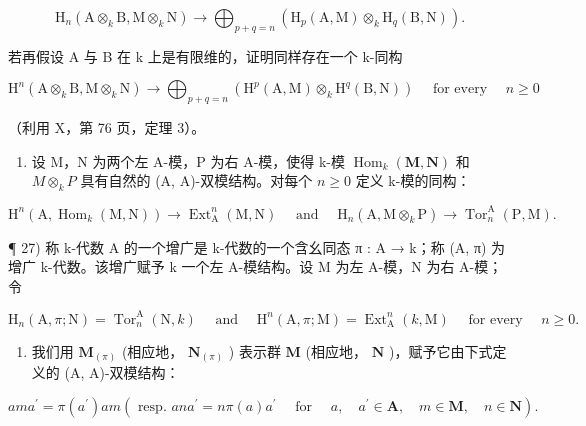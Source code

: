 \[
\mathrm{H} _ {n} (\mathrm{A} \otimes_ {k} \mathrm{B}, \mathrm{M} \otimes_ {k} \mathrm{N}) \rightarrow \bigoplus_ {p + q = n} \left(\mathrm{H} _ {p} (\mathrm{A}, \mathrm{M}) \otimes_ {k} \mathrm{H} _ {q} (\mathrm{B}, \mathrm{N})\right).
\]

若再假设 A 与 B 在 k 上是有限维的，证明同样存在一个 k-同构

\[
\mathrm{H} ^ {n} (\mathrm{A} \otimes_ {k} \mathrm{B}, \mathrm{M} \otimes_ {k} \mathrm{N}) \rightarrow \bigoplus_ {p + q = n} \left(\mathrm{H} ^ {p} (\mathrm{A}, \mathrm{M}) \otimes_ {k} \mathrm{H} ^ {q} (\mathrm{B}, \mathrm{N})\right) \quad \text { for   every } \quad n \geqslant 0
\]

（利用 X，第 76 页，定理 3）。

\begin{enumerate}
\def\labelenumi{\alph{enumi})}
\setcounter{enumi}{4}
\tightlist
\item
  设 M，N 为两个左 A-模，P 为右 A-模，使得 k-模 \(\operatorname{Hom}_{k}(\mathbf{M}, \mathbf{N})\) 和 \(M \otimes_{k} P\) 具有自然的 (A, A)-双模结构。对每个 \(n \geqslant 0\) 定义 k-模的同构：
\end{enumerate}

\[
\mathrm{H} ^ {n} (\mathrm{A}, \operatorname{Hom} _ {k} (\mathrm{M}, \mathrm{N})) \rightarrow \operatorname{Ext} _ {\mathrm{A}} ^ {n} (\mathrm{M}, \mathrm{N}) \quad \text { and } \quad \mathrm{H} _ {n} (\mathrm{A}, \mathrm{M} \otimes_ {k} \mathrm{P}) \rightarrow \operatorname{Tor} _ {n} ^ {\mathrm{A}} (\mathrm{P}, \mathrm{M}).
\]

¶ 27) 称 k-代数 A 的一个增广是 k-代数的一个含幺同态 π : A → k；称 (A, π) 为增广 k-代数。该增广赋予 k 一个左 A-模结构。设 M 为左 A-模，N 为右 A-模；令

\[
\mathrm{H} _ {n} (\mathrm{A}, \pi ; \mathrm{N}) = \operatorname{Tor} _ {n} ^ {\mathrm{A}} (\mathrm{N}, k) \quad \text { and } \quad \mathrm{H} ^ {n} (\mathrm{A}, \pi ; \mathrm{M}) = \operatorname{Ext} _ {\mathrm{A}} ^ {n} (k, \mathrm{M}) \quad \text { for   every } \quad n \geqslant 0.
\]

\begin{enumerate}
\def\labelenumi{\alph{enumi})}
\tightlist
\item
  我们用 \(\mathbf{M}_{(\pi)}\) (相应地， \(\mathbf{N}_{(\pi)}\) ) 表示群 \(\mathbf{M}\) (相应地， \(\mathbf{N}\) )，赋予它由下式定义的 (A, A)-双模结构：
\end{enumerate}

\[
a m a ^ {\prime} = \pi (a ^ {\prime}) a m (\text { resp. } a n a ^ {\prime} = n \pi (a) a ^ {\prime} \quad \text { for } \quad a, \quad a ^ {\prime} \in \mathbf {A}, \quad m \in \mathbf {M}, \quad n \in \mathbf {N}).
\]


